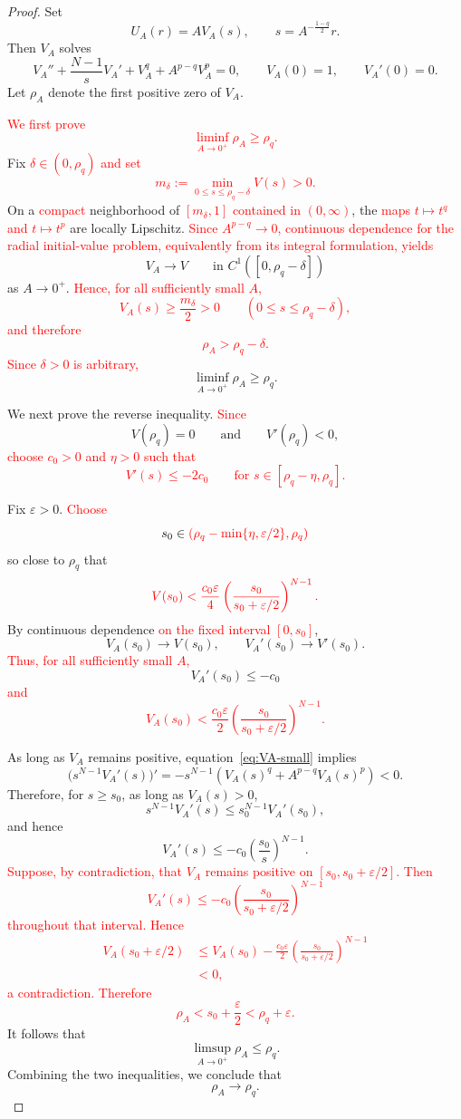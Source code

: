\documentclass[11pt]{article}
\theoremstyle{definition}
\begin{document}
\begin{proof}
Set
\[
U_A(r)
=
A V_A(s),
\qquad
s=A^{-\frac{1-q}{2}}r.
\]
Then $V_A$ solves
\begin{equation}
\label{eq:VA-small}
V_A''
+\frac{N-1}{s}V_A'
+V_A^q
+A^{p-q}V_A^p
=0,
\qquad
V_A(0)=1,
\qquad
V_A'(0)=0.
\end{equation}
Let $\rho_A$ denote the first positive zero of $V_A$.

\textcolor{red}{We first prove
\[
\liminf_{A\to0^+}\rho_A\geq\rho_q.
\]}
Fix \textcolor{red}{$\delta\in(0,\rho_q)$ and set
\[
m_\delta
:=
\min_{0\leq s\leq\rho_q-\delta}V(s)>0.
\]}
On a \textcolor{red}{compact} neighborhood of
\textcolor{red}{$[m_\delta,1]$ contained in $(0,\infty)$}, the
\textcolor{red}{maps $t\mapsto t^q$ and $t\mapsto t^p$} are locally
Lipschitz. \textcolor{red}{Since $A^{p-q}\to0$, continuous dependence
for the radial initial-value problem, equivalently from its integral
formulation, yields}
\[
V_A\longrightarrow V
\qquad\text{in }C^1([0,\rho_q-\delta])
\]
as $A\to0^+$. \textcolor{red}{Hence, for all sufficiently small $A$,
\[
V_A(s)\geq\frac{m_\delta}{2}>0
\qquad
(0\leq s\leq\rho_q-\delta),
\]
and therefore
\[
\rho_A>\rho_q-\delta.
\]
Since $\delta>0$ is arbitrary,}
\[
\liminf_{A\to0^+}\rho_A\geq\rho_q.
\]

We next prove the reverse inequality. \textcolor{red}{Since}
\[
V(\rho_q)=0
\qquad\text{and}\qquad
V'(\rho_q)<0,
\]
\textcolor{red}{choose $c_0>0$ and $\eta>0$ such that
\[
V'(s)\leq-2c_0
\qquad
\text{for }
s\in[\rho_q-\eta,\rho_q].
\]}

Fix $\varepsilon>0$.
\textcolor{red}{Choose}
\[
s_0\in
\textcolor{red}{
\left(
\rho_q-\min\{\eta,\varepsilon/2\},
\rho_q
\right)}
\]
so close to $\rho_q$ that
\[
\textcolor{red}{
V(s_0)
<
\frac{c_0\varepsilon}{4}
\left(
\frac{s_0}{s_0+\varepsilon/2}
\right)^{N-1}.}
\]
By continuous dependence
\textcolor{red}{on the fixed interval $[0,s_0]$},
\[
V_A(s_0)\to V(s_0),
\qquad
V_A'(s_0)\to V'(s_0).
\]
\textcolor{red}{Thus, for all sufficiently small $A$,}
\[
V_A'(s_0)\leq -c_0
\]
\textcolor{red}{and
\[
V_A(s_0)
<
\frac{c_0\varepsilon}{2}
\left(
\frac{s_0}{s_0+\varepsilon/2}
\right)^{N-1}.
\]}

As long as $V_A$ remains positive, equation~\eqref{eq:VA-small}
implies
\[
\bigl(s^{N-1}V_A'(s)\bigr)'
=
-s^{N-1}
\left(
V_A(s)^q+A^{p-q}V_A(s)^p
\right)
<0.
\]
Therefore, for $s\geq s_0$, as long as $V_A(s)>0$,
\[
s^{N-1}V_A'(s)
\leq
s_0^{N-1}V_A'(s_0),
\]
and hence
\[
V_A'(s)
\leq
-c_0\left(\frac{s_0}{s}\right)^{N-1}.
\]
\textcolor{red}{Suppose, by contradiction, that $V_A$ remains positive
on $[s_0,s_0+\varepsilon/2]$. Then
\[
V_A'(s)
\leq
-c_0
\left(
\frac{s_0}{s_0+\varepsilon/2}
\right)^{N-1}
\]
throughout that interval. Hence
\[
\begin{aligned}
V_A(s_0+\varepsilon/2)
&\leq
V_A(s_0)
-\frac{c_0\varepsilon}{2}
\left(
\frac{s_0}{s_0+\varepsilon/2}
\right)^{N-1}\\
&<0,
\end{aligned}
\]
a contradiction. Therefore
\[
\rho_A<s_0+\frac{\varepsilon}{2}<\rho_q+\varepsilon.
\]}
It follows that
\[
\limsup_{A\to0^+}\rho_A\leq\rho_q.
\]
Combining the two inequalities, we conclude that
\[
\rho_A\longrightarrow\rho_q.
\]


\end{proof}
\end{document}
